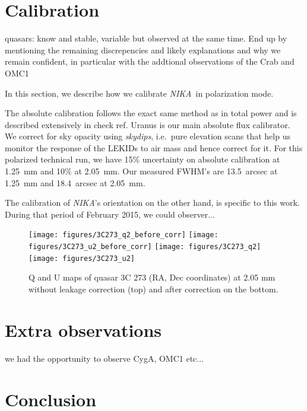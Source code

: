 \documentclass[twocolumn,traditabstract]{aa}
\newcommand{\nika}{{\it NIKA}}
\begin{document}
{%

\section{Calibration}
\label{se:calib}
{\color{green} quasars: know and stable, variable but observed at the same time. End up by
mentioning the remaining discrepencies and likely explanations and why we remain
confident, in particular with the addtional observations of the Crab and OMC1}

In this section, we describe how we calibrate \nika~in polarization mode.

The absolute calibration follows the exact same method as in total power and is
described extensively in \cite{catalano2014} {\color{red} check ref}. Uranus is
our main absolute flux calibrator. We correct for sky opacity using {\it
  skydips}, i.e.~pure elevation scans that help us monitor the response of the
LEKIDs to air mass and hence correct for it. For this polarized technical run,
we have 15\% uncertainty on absolute calibration at 1.25~mm and 10\% at
2.05~mm. Our measured FWHM's are 13.5~arcsec at 1.25~mm and 18.4~arcsec at 2.05~mm.

The calibration of \nika's orientation on the other hand, is specific to this
work. During that period of February 2015, we could observer...



\begin{figure}
  \begin{center}
    \texttt{[image: figures/3C273\_q2\_before\_corr]}
    \texttt{[image: figures/3C273\_u2\_before\_corr]}
    \texttt{[image: figures/3C273\_q2]}
    \texttt{[image: figures/3C273\_u2]}
    \caption{ Q and U maps of quasar 3C 273 (RA, Dec coordinates)
      at 2.05 mm without leakage correction (top) and after correction on the
      bottom.}
    \label{3c273_ex}
  \end{center}
\end{figure}

\section{Extra observations}
we had the opportunity to observe CygA, OMC1 etc...

\section{Conclusion}
}
\newpage
\end{document}
